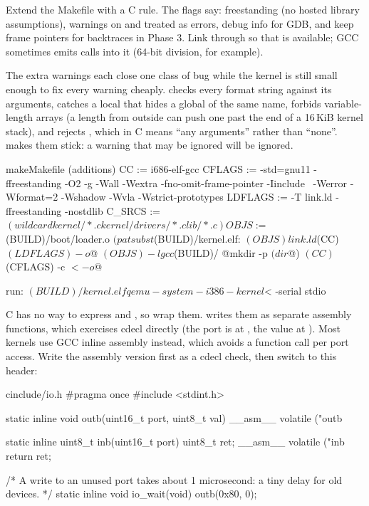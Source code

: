 \documentclass[11pt,a4paper]{article}
\begin{document}
Extend the Makefile with a C rule. The flags say: freestanding (no hosted library assumptions), warnings on and
treated as errors, debug info for GDB, and keep frame pointers for backtraces in Phase 3. Link through  so
that  is available; GCC sometimes emits calls into it (64-bit division, for example).

The extra warnings each close one class of bug while the kernel is still small enough to fix every warning
cheaply.  checks every format string against its arguments,  catches a local that
hides a global of the same name,  forbids variable-length arrays (a length from outside can push one
past the end of a 16\,KiB kernel stack), and  rejects , which in C means
``any arguments'' rather than ``none''.  makes them stick: a warning that may be ignored will be
ignored.

\begin{lst}{make}{Makefile (additions)}
CC      := i686-elf-gcc
CFLAGS  := -std=gnu11 -ffreestanding -O2 -g -Wall -Wextra -fno-omit-frame-pointer -Iinclude \
           -Werror -Wformat=2 -Wshadow -Wvla -Wstrict-prototypes
LDFLAGS := -T link.ld -ffreestanding -nostdlib
C_SRCS  := $(wildcard kernel/*.c kernel/drivers/*.c lib/*.c)
OBJS    := $(BUILD)/boot/loader.o $(patsubst %

$(BUILD)/kernel.elf: $(OBJS) link.ld
	$(CC) $(LDFLAGS) -o $@ $(OBJS) -lgcc

$(BUILD)/%
	@mkdir -p $(dir $@)
	$(CC) $(CFLAGS) -c $< -o $@

run: $(BUILD)/kernel.elf
	qemu-system-i386 -kernel $< -serial stdio
\end{lst}

C has no way to express  and , so wrap them. \LOB writes them as separate assembly functions,
which exercises cdecl directly (the port is at \code{[esp+4]}, the value at \code{[esp+8]}). Most kernels use GCC
inline assembly instead, which avoids a function call per port access. Write the assembly version first as
a cdecl check, then switch to this header:

\begin{lst}{c}{include/io.h}
#pragma once
#include <stdint.h>

static inline void outb(uint16_t port, uint8_t val)
{
    __asm__ volatile ("outb %
}

static inline uint8_t inb(uint16_t port)
{
    uint8_t ret;
    __asm__ volatile ("inb %
    return ret;
}

/* A write to an unused port takes about 1 microsecond: a tiny delay for old devices. */
static inline void io_wait(void) { outb(0x80, 0); }
\end{lst}
\end{document}
